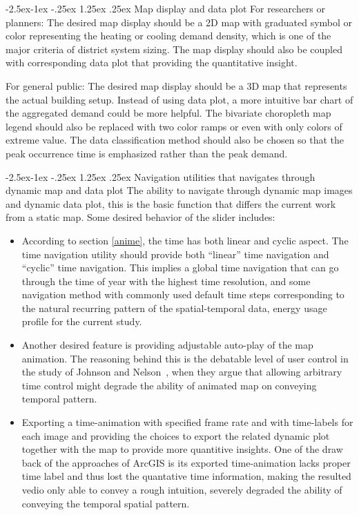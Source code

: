\documentclass[hidelinks,12pt]{article}
\makeatletter
\renewcommand\paragraph{\@startsection{paragraph}{4}{\z@}%
            {-2.5ex\@plus -1ex \@minus -.25ex}%
            {1.25ex \@plus .25ex}%
            {\normalfont\normalsize\bfseries}}
\makeatother
\begin{document}
\paragraph{Map display and data plot}
For researchers or planners: The desired map display should be a 2D
map with graduated symbol or color representing the heating or cooling
demand density, which is one of the major criteria of district system
sizing.  The map display should also be coupled with corresponding
data plot that providing the quantitative insight.

For general public: The desired map display should be a 3D map that
represents the actual building setup. Instead of using data plot, a
more intuitive bar chart of the aggregated demand could be more
helpful. The bivariate choropleth map legend should also be replaced
with two color ramps or even with only colors of extreme value. The
data classification method should also be chosen so that the peak
occurrence time is emphasized rather than the peak demand.

\paragraph{Navigation utilities that navigates through dynamic map
  and data plot}
The ability to navigate through dynamic map images and dynamic data
plot, this is the basic function that differs the current work from a
static map. Some desired behavior of the slider includes:
\begin{itemize}
\item According to section \ref{anime}, the time has both linear and
  cyclic aspect. The time navigation utility should provide both
  ``linear'' time navigation and ``cyclic'' time navigation. This
  implies a global time navigation that can go through the time of
  year with the highest time resolution, and some navigation method
  with commonly used default time steps corresponding to the natural
  recurring pattern of the spatial-temporal data, energy usage profile
  for the current study.
\item Another desired feature is providing adjustable auto-play of the
  map animation. The reasoning behind this is the debatable level of
  user control in the study of Johnson and Nelson~\cite{Nelson1998},
  when they argue that allowing arbitrary time control might degrade
  the ability of animated map on conveying temporal pattern.
\item Exporting a time-animation with specified frame rate and with
  time-labels for each image and providing the choices to export the
  related dynamic plot together with the map to provide more
  quantitive insights. One of the draw back of the approaches of
  ArcGIS is its exported time-animation lacks proper time label and
  thus lost the quantative time information, making the resulted vedio
  only able to convey a rough intuition, severely degraded the ability
  of conveying the temporal spatial pattern.
\end{itemize}
\end{document}
